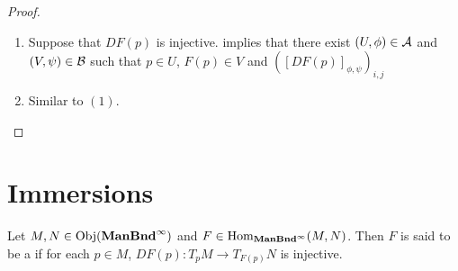 \documentclass{book}
\begin{document}
	\begin{proof}\
		\begin{enumerate}
			\item Suppose that $DF(p)$ is injective.  implies that there exist $(U, \phi) \in \mathcal{A}$ and $(V, \psi) \in \mathcal{B}$ such that $p \in U$, $F(p) \in V$ and $([DF(p)]_{\phi, \psi})_{i,j}$
			\item Similar to $(1)$. 
		\end{enumerate}
	\end{proof}





































































	
	
	
	
	
	
	
	
	
	
	
	
	\newpage
	\section{Immersions}
	
	\begin{defn} 
		Let $M, N \in \operatorname{Obj}(\operatorname*{\text{\textbf{ManBnd}}^{\infty}})$ and $F \in \operatorname{Hom}_{\operatorname*{\text{\textbf{ManBnd}}^{\infty}}}(M, N)$. Then $F$ is said to be a  if for each $p \in M$, $DF(p):T_pM\rightarrow T_{F(p)}N$ is injective.
	\end{defn}
\end{document}
